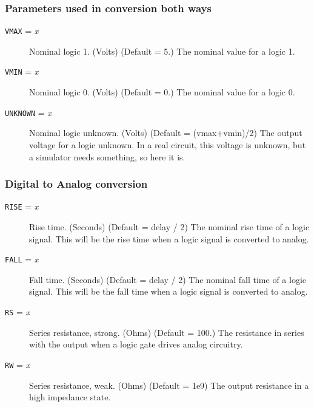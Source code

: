 \subsubsection{Parameters used in conversion both ways}
\begin{description}

\item[{\tt VMAX} = {\it x}] Nominal logic 1.  (Volts) (Default = 5.) The
nominal value for a logic 1.

\item[{\tt VMIN} = {\it x}] Nominal logic 0.  (Volts) (Default = 0.) The
nominal value for a logic 0.

\item[{\tt UNKNOWN} = {\it x}] Nominal logic unknown.  (Volts) 
(Default = (vmax+vmin)/2) The output voltage for a logic unknown.  In
a real circuit, this voltage is unknown, but a simulator needs
something, so here it is.

\end{description}
\subsubsection{Digital to Analog conversion}
\begin{description}

\item[{\tt RISE} = {\it x}] Rise time. (Seconds) (Default = delay / 2) The
nominal rise time of a logic signal.  This will be the rise time when
a logic signal is converted to analog.

\item[{\tt FALL} = {\it x}] Fall time. (Seconds) (Default = delay / 2) The
nominal fall time of a logic signal.  This will be the fall time when a
logic signal is converted to analog.

\item[{\tt RS} = {\it x}] Series resistance, strong. (Ohms) (Default =
100.)  The resistance in series with the output when a logic gate drives
analog circuitry.

\item[{\tt RW} = {\it x}] Series resistance, weak. (Ohms) (Default = 1e9)
The output resistance in a high impedance state.

\end{description}
